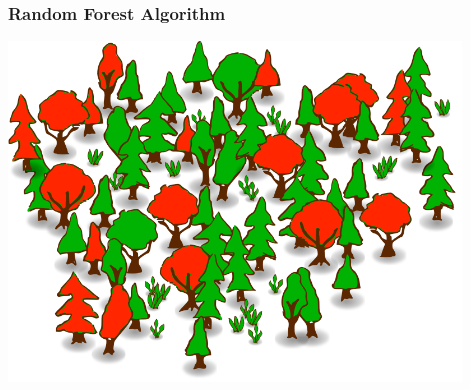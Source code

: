 \documentclass{beamer}
\begin{document}
\begin{frame}
\frametitle{Random Forest Algorithm}
\centering
\includegraphics[width=0.9\textwidth]{random_forest.png}\\
\end{frame}
\end{document}
